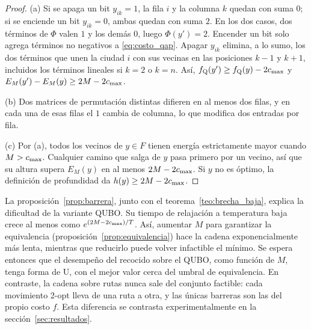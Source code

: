 \begin{proof}
(a) Si se apaga un bit \(y_{ik}=1\), la fila \(i\) y la columna \(k\)
quedan con suma \(0\); si se enciende un bit \(y_{ik}=0\), ambas quedan
con suma \(2\). En los dos casos, dos términos de \(\Phi\) valen \(1\) y
los demás \(0\), luego \(\Phi(y')=2\). Encender un bit solo agrega
términos no negativos a \eqref{eq:costo_qap}. Apagar \(y_{ik}\) elimina,
a lo sumo, los dos términos que unen la ciudad \(i\) con sus vecinas en
las posiciones \(k-1\) y \(k+1\), incluidos los términos lineales si
\(k=2\) o \(k=n\). Así, \(f_{\mathrm Q}(y')\ge f_{\mathrm Q}(y)-2c_{\max}\)
y \(E_M(y')-E_M(y)\ge 2M-2c_{\max}\).

(b) Dos matrices de permutación distintas difieren en al menos dos
filas, y en cada una de esas filas el \(1\) cambia de columna, lo que
modifica dos entradas por fila.

(c) Por (a), todos los vecinos de \(y\in F\) tienen energía
estrictamente mayor cuando \(M>c_{\max}\). Cualquier camino que salga de
\(y\) pasa primero por un vecino, así que su altura supera \(E_M(y)\) en
al menos \(2M-2c_{\max}\). Si \(y\) no es óptimo, la definición de
profundidad da \(h(y)\ge 2M-2c_{\max}\).
\end{proof}

La proposición~\ref{prop:barrera}, junto con el
teorema~\ref{teo:brecha_baja}, explica la dificultad de la variante
QUBO. Su tiempo de relajación a temperatura baja crece al menos como
\(e^{(2M-2c_{\max})/T}\). Así, aumentar \(M\) para garantizar la
equivalencia (proposición~\ref{prop:equivalencia}) hace la cadena
exponencialmente más lenta, mientras que reducirlo puede volver
infactible el mínimo. Se espera entonces que el desempeño del recocido
sobre el QUBO, como función de \(M\), tenga forma de U, con el mejor
valor cerca del umbral de equivalencia. En contraste, la cadena sobre
rutas nunca sale del conjunto factible: cada movimiento 2-opt lleva de
una ruta a otra, y las únicas barreras son las del propio costo \(f\).
Esta diferencia se contrasta experimentalmente en la
sección~\ref{sec:resultados}.
